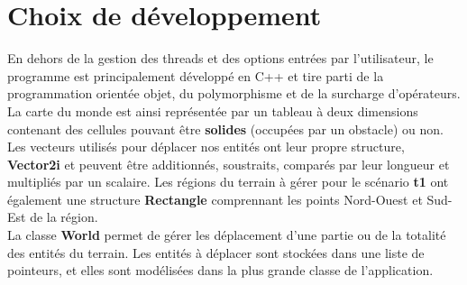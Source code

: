 \documentclass[11pt]{article} %
\begin{document}
\section{Choix de développement}
En dehors de la gestion des threads et des options entrées par l'utilisateur, le programme est principalement développé en C++ et tire parti de la programmation orientée objet, du polymorphisme et de la surcharge d'opérateurs. \\
La carte du monde est ainsi représentée par un tableau à deux dimensions contenant des cellules pouvant être \textbf{solides} (occupées par un obstacle) ou non. \\
Les vecteurs utilisés pour déplacer nos entités ont leur propre structure, \textbf{Vector2i} et peuvent être additionnés, soustraits, comparés par leur longueur et multipliés par un scalaire. Les régions du terrain à gérer pour le scénario \textbf{t1} ont également une structure \textbf{Rectangle} comprennant les points Nord-Ouest et Sud-Est de la région. \\
La classe \textbf{World} permet de gérer les déplacement d'une partie ou de la totalité des entités du terrain. Les entités à déplacer sont stockées dans une liste de pointeurs, et elles sont modélisées dans la plus grande classe de l'application.
\end{document}
